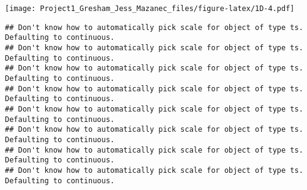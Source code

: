 \documentclass[
]{article}
\newenvironment{Shaded}{\begin{snugshade}}{\end{snugshade}}
\newcommand{\CommentTok}[1]{\textcolor[rgb]{0.56,0.35,0.01}{\textit{#1}}}
\newcommand{\DataTypeTok}[1]{\textcolor[rgb]{0.13,0.29,0.53}{#1}}
\newcommand{\DecValTok}[1]{\textcolor[rgb]{0.00,0.00,0.81}{#1}}
\newcommand{\KeywordTok}[1]{\textcolor[rgb]{0.13,0.29,0.53}{\textbf{#1}}}
\newcommand{\NormalTok}[1]{#1}
\newcommand{\OperatorTok}[1]{\textcolor[rgb]{0.81,0.36,0.00}{\textbf{#1}}}
\newcommand{\StringTok}[1]{\textcolor[rgb]{0.31,0.60,0.02}{#1}}
\begin{document}
\texttt{[image: Project1\_Gresham\_Jess\_Mazanec\_files/figure-latex/1D-4.pdf]}

\begin{Shaded}
\end{Shaded}

\begin{verbatim}
## Don't know how to automatically pick scale for object of type ts. Defaulting to continuous.
## Don't know how to automatically pick scale for object of type ts. Defaulting to continuous.
## Don't know how to automatically pick scale for object of type ts. Defaulting to continuous.
## Don't know how to automatically pick scale for object of type ts. Defaulting to continuous.
## Don't know how to automatically pick scale for object of type ts. Defaulting to continuous.
## Don't know how to automatically pick scale for object of type ts. Defaulting to continuous.
## Don't know how to automatically pick scale for object of type ts. Defaulting to continuous.
## Don't know how to automatically pick scale for object of type ts. Defaulting to continuous.
\end{verbatim}
\end{document}
